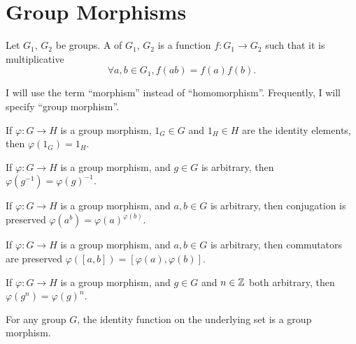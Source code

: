 \section{Group Morphisms}

\begin{definition}
Let $G_{1}$, $G_{2}$ be groups.
A  of $G_{1}$, $G_{2}$ is a function
$f\colon G_{1}\to G_{2}$ such that it is multiplicative
\begin{equation}
\forall a,b\in G_{1}, f(ab) = f(a)f(b).
\end{equation}
\end{definition}

\begin{def-remark}
I will use the term ``morphism'' instead of ``homomorphism''.
Frequently, I will specify ``group morphism''.
\end{def-remark}

\begin{theorem}
If $\varphi\colon G\to H$ is a group morphism, $1_{G}\in G$ and
$1_{H}\in H$ are the identity elements, then $\varphi(1_{G})=1_{H}$.
\end{theorem}

\begin{theorem}
If $\varphi\colon G\to H$ is a group morphism, and $g\in G$ is
arbitrary, then $\varphi(g^{-1})=\varphi(g)^{-1}$.
\end{theorem}

\begin{theorem}
If $\varphi\colon G\to H$ is a group morphism, and $a,b\in G$ is
arbitrary, then conjugation is preserved $\varphi(a^{b})=\varphi(a)^{\varphi(b)}$.
\end{theorem}

\begin{theorem}
If $\varphi\colon G\to H$ is a group morphism, and $a,b\in G$ is
arbitrary, then commutators are preserved $\varphi([a,b])=[\varphi(a), \varphi(b)]$.
\end{theorem}

\begin{theorem}
If $\varphi\colon G\to H$ is a group morphism, and $g\in G$ and
$n\in\mathbb{Z}$ both arbitrary, then $\varphi(g^{n})=\varphi(g)^{n}$.
\end{theorem}

\begin{theorem}
For any group $G$, the identity function on the underlying set is a
group morphism.
\end{theorem}

